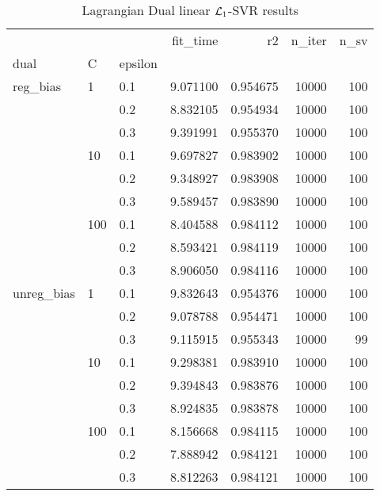 \begin{table}[H]
\centering
\caption{Lagrangian Dual linear $\protect \mathcal{L}_1$-SVR results}
\label{linear_lagrangian_dual_l1_svr_cv_results}
\begin{tabular}{lllrrrr}
\toprule
           &     &     &  fit\_time &        r2 &  n\_iter &  n\_sv \\
dual & C & epsilon &           &           &         &       \\
\midrule
reg\_bias & 1   & 0.1 &  9.071100 &  0.954675 &   10000 &   100 \\
           &     & 0.2 &  8.832105 &  0.954934 &   10000 &   100 \\
           &     & 0.3 &  9.391991 &  0.955370 &   10000 &   100 \\
           & 10  & 0.1 &  9.697827 &  0.983902 &   10000 &   100 \\
           &     & 0.2 &  9.348927 &  0.983908 &   10000 &   100 \\
           &     & 0.3 &  9.589457 &  0.983890 &   10000 &   100 \\
           & 100 & 0.1 &  8.404588 &  0.984112 &   10000 &   100 \\
           &     & 0.2 &  8.593421 &  0.984119 &   10000 &   100 \\
           &     & 0.3 &  8.906050 &  0.984116 &   10000 &   100 \\
unreg\_bias & 1   & 0.1 &  9.832643 &  0.954376 &   10000 &   100 \\
           &     & 0.2 &  9.078788 &  0.954471 &   10000 &   100 \\
           &     & 0.3 &  9.115915 &  0.955343 &   10000 &    99 \\
           & 10  & 0.1 &  9.298381 &  0.983910 &   10000 &   100 \\
           &     & 0.2 &  9.394843 &  0.983876 &   10000 &   100 \\
           &     & 0.3 &  8.924835 &  0.983878 &   10000 &   100 \\
           & 100 & 0.1 &  8.156668 &  0.984115 &   10000 &   100 \\
           &     & 0.2 &  7.888942 &  0.984121 &   10000 &   100 \\
           &     & 0.3 &  8.812263 &  0.984121 &   10000 &   100 \\
\bottomrule
\end{tabular}
\end{table}
